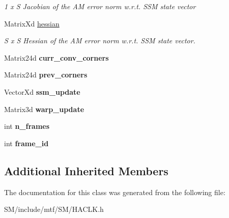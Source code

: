 \begin{DoxyCompactItemize}
\begin{DoxyCompactList}\small\item\em 1 x S Jacobian of the A\-M error norm w.\-r.\-t. S\-S\-M state vector \end{DoxyCompactList}\item 
\hypertarget{classHACLK_a0c0831c264ccf58e1c8140541ea107ef}{Matrix\-Xd \hyperlink{classHACLK_a0c0831c264ccf58e1c8140541ea107ef}{hessian}}\label{classHACLK_a0c0831c264ccf58e1c8140541ea107ef}

\begin{DoxyCompactList}\small\item\em S x S Hessian of the A\-M error norm w.\-r.\-t. S\-S\-M state vector. \end{DoxyCompactList}\item 
\hypertarget{classHACLK_ad37d4fa90531b6db259173e108c54cb6}{Matrix24d {\bfseries curr\-\_\-conv\-\_\-corners}}\label{classHACLK_ad37d4fa90531b6db259173e108c54cb6}

\item 
\hypertarget{classHACLK_a72de22bc57f15c21013d482d46bfee61}{Matrix24d {\bfseries prev\-\_\-corners}}\label{classHACLK_a72de22bc57f15c21013d482d46bfee61}

\item 
\hypertarget{classHACLK_a589b547a4e40bb2e5a7477a2730401bd}{Vector\-Xd {\bfseries ssm\-\_\-update}}\label{classHACLK_a589b547a4e40bb2e5a7477a2730401bd}

\item 
\hypertarget{classHACLK_af0c99a7979057ee8bf1a762525d58cc5}{Matrix3d {\bfseries warp\-\_\-update}}\label{classHACLK_af0c99a7979057ee8bf1a762525d58cc5}

\item 
\hypertarget{classHACLK_ab1e939ce76a7213dd90f3b7a0cdc8050}{int {\bfseries n\-\_\-frames}}\label{classHACLK_ab1e939ce76a7213dd90f3b7a0cdc8050}

\item 
\hypertarget{classHACLK_a0c1bc94737457eccb962ef8d3f624d6f}{int {\bfseries frame\-\_\-id}}\label{classHACLK_a0c1bc94737457eccb962ef8d3f624d6f}

\end{DoxyCompactItemize}
\subsection*{Additional Inherited Members}


The documentation for this class was generated from the following file\-:\begin{DoxyCompactItemize}
\item 
S\-M/include/mtf/\-S\-M/H\-A\-C\-L\-K.\-h\end{DoxyCompactItemize}

